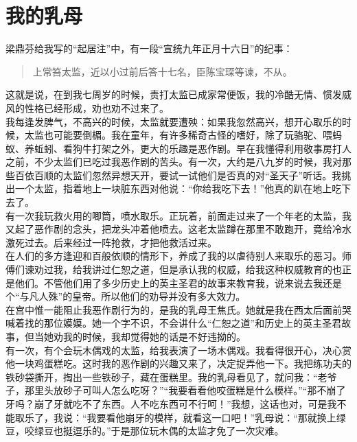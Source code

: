 \fancyhead[RO]{} %
\fancyhead[LE]{} %
\chapter*{我的乳母}
\thispagestyle{empty}
梁鼎芬给我写的“起居注”中，有一段“宣统九年正月十六日”的纪事：\\

\begin{quote}
	上常笞太监，近以小过前后答十七名，臣陈宝琛等谏，不从。\\
\end{quote}

这就是说，在到我七周岁的时候，责打太监已成家常便饭，我的冷酷无情、惯发威风的性格已经形成，劝也劝不过来了。\\

我每逢发脾气，不高兴的时候，太监就要遭殃：如果我忽然高兴，想开心取乐的时候，太监也可能要倒楣。我在童年，有许多稀奇古怪的嗜好，除了玩骆驼、喂蚂蚁、养蚯蚓、看狗牛打架之外，更大的乐趣是恶作剧。早在我懂得利用敬事房打人之前，不少太监们已吃过我恶作剧的苦头。有一次，大约是八九岁的时候，我对那些百依百顺的太监们忽然异想天开，要试一试他们是否真的对“圣天子”听话。我挑出一个太监，指着地上一块脏东西对他说：“你给我吃下去！”他真的趴在地上吃下去了。\\

有一次我玩救火用的唧筒，喷水取乐。正玩着，前面走过来了一个年老的太监，我又起了恶作剧的念头，把龙头冲着他喷去。这老太监蹲在那里不敢跑开，竟给冷水激死过去。后来经过一阵抢救，才把他救活过来。\\

在人们的多方逢迎和百般依顺的情形下，养成了我的以虐待别人来取乐的恶习。师傅们谏劝过我，给我讲过仁恕之道，但是承认我的权威，给我这种权威教育的也正是他们。不管他们用了多少历史上的英主圣君的故事来教育我，说来说去我还是个“与凡人殊”的皇帝。所以他们的劝导并没有多大效力。\\

在宫中惟一能阻止我恶作剧行为的，是我的乳母王焦氏。她就是我在西太后面前哭喊着找的那位嫫嫫。她一个字不识，不会讲什么“仁恕之道”和历史上的英主圣君故事，但当她劝我的时候，我却觉得她的话是不好违拗的。\\

有一次，有个会玩木偶戏的太监，给我表演了一场木偶戏。我看得很开心，决心赏他一块鸡蛋糕吃。这时我的恶作剧的兴趣又来了，决定捉弄他一下。我把练功夫的铁砂袋撕开，掏出一些铁砂子，藏在蛋糕里。我的乳母看见了，就问我：“老爷子，那里头放砂子可叫人怎么吃呀？”“我要看看他咬蛋糕是什么模样。”“那不崩了牙吗？崩了牙就吃不了东西。人不吃东西可不行呵！”我想，这话也对，可是我不能取乐了，我说：“我要看他崩牙的模样，就看这一口吧！”乳母说：“那就换上绿豆，咬绿豆也挺逗乐的。”于是那位玩木偶的太监才免了一次灾难。\\

